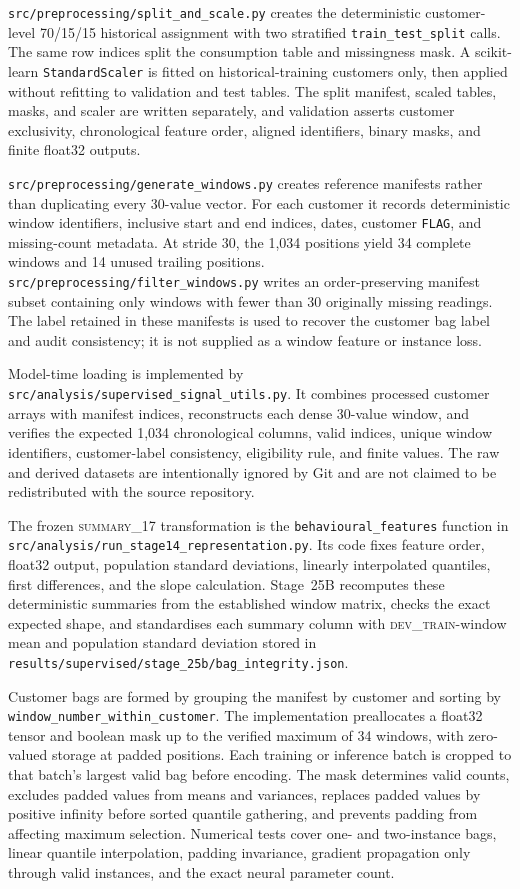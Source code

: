 \texttt{src/preprocessing/split\_and\_scale.py} creates the deterministic customer-level 70/15/15 historical assignment with two stratified \texttt{train\_test\_split} calls. The same row indices split the consumption table and missingness mask. A scikit-learn \texttt{StandardScaler} is fitted on historical-training customers only, then applied without refitting to validation and test tables. The split manifest, scaled tables, masks, and scaler are written separately, and validation asserts customer exclusivity, chronological feature order, aligned identifiers, binary masks, and finite float32 outputs.

\texttt{src/preprocessing/generate\_windows.py} creates reference manifests rather than duplicating every 30-value vector. For each customer it records deterministic window identifiers, inclusive start and end indices, dates, customer \texttt{FLAG}, and missing-count metadata. At stride 30, the 1,034 positions yield 34 complete windows and 14 unused trailing positions. \texttt{src/preprocessing/filter\_windows.py} writes an order-preserving manifest subset containing only windows with fewer than 30 originally missing readings. The label retained in these manifests is used to recover the customer bag label and audit consistency; it is not supplied as a window feature or instance loss.

Model-time loading is implemented by \texttt{src/analysis/supervised\_signal\_utils.py}. It combines processed customer arrays with manifest indices, reconstructs each dense 30-value window, and verifies the expected 1,034 chronological columns, valid indices, unique window identifiers, customer-label consistency, eligibility rule, and finite values. The raw and derived datasets are intentionally ignored by Git and are not claimed to be redistributed with the source repository.

The frozen \textsc{summary\_17} transformation is the \texttt{behavioural\_features} function in \texttt{src/analysis/run\_stage14\_representation.py}. Its code fixes feature order, float32 output, population standard deviations, linearly interpolated quantiles, first differences, and the slope calculation. Stage~25B recomputes these deterministic summaries from the established window matrix, checks the exact expected shape, and standardises each summary column with \textsc{dev\_train}-window mean and population standard deviation stored in \texttt{results/supervised/stage\_25b/bag\_integrity.json}.

Customer bags are formed by grouping the manifest by customer and sorting by \texttt{window\_number\_within\_customer}. The implementation preallocates a float32 tensor and boolean mask up to the verified maximum of 34 windows, with zero-valued storage at padded positions. Each training or inference batch is cropped to that batch's largest valid bag before encoding. The mask determines valid counts, excludes padded values from means and variances, replaces padded values by positive infinity before sorted quantile gathering, and prevents padding from affecting maximum selection. Numerical tests cover one- and two-instance bags, linear quantile interpolation, padding invariance, gradient propagation only through valid instances, and the exact neural parameter count.

